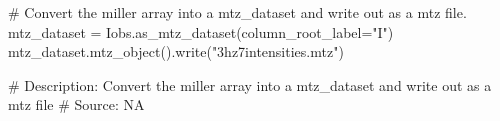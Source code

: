 # Convert the miller array into a mtz_dataset and write out as a mtz file.
mtz_dataset = Iobs.as_mtz_dataset(column_root_label="I")
mtz_dataset.mtz_object().write("3hz7intensities.mtz")

# Description:  Convert the miller array into a mtz_dataset and write out as a mtz file
# Source:  NA

